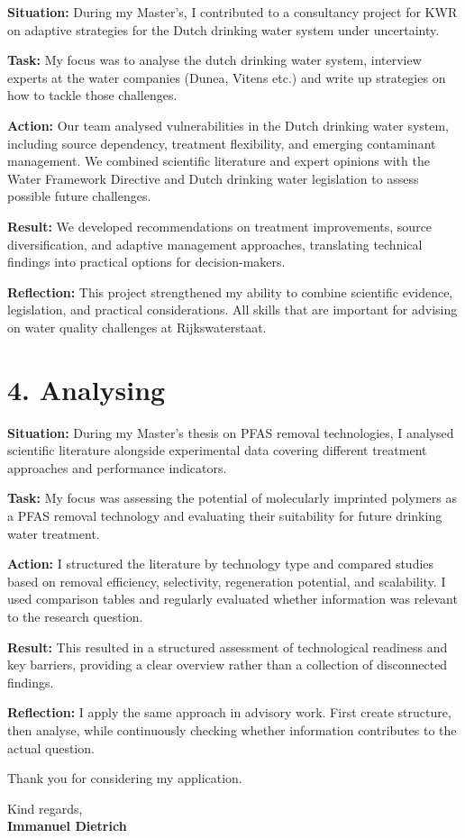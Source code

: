 \documentclass[11pt]{report}
\begin{document}
\begin{titlepage}
\textbf{Situation:} During my Master's, I contributed to a consultancy project for KWR on adaptive strategies for the Dutch drinking water system under uncertainty.

\textbf{Task:} My focus was to analyse the dutch drinking water system, interview experts at the water companies (Dunea, Vitens etc.) and write up strategies on how to tackle those challenges.

\textbf{Action:} Our team analysed vulnerabilities in the Dutch drinking water system, including source dependency, treatment flexibility, and emerging contaminant management. 
We combined scientific literature and expert opinions with the Water Framework Directive and Dutch drinking water legislation to assess possible future challenges.

\textbf{Result:} We developed recommendations on treatment improvements, source diversification, and adaptive management approaches, translating technical findings into practical options for decision-makers.

\textbf{Reflection:} This project strengthened my ability to combine scientific evidence, legislation, and practical considerations. All skills that are important for advising on water quality challenges at Rijkswaterstaat.

\vspace{1em}

\section*{4. Analysing}

\textbf{Situation:} During my Master's thesis on PFAS removal technologies, I analysed scientific literature alongside experimental data covering different treatment approaches and performance indicators.

\textbf{Task:} My focus was assessing the potential of molecularly imprinted polymers as a PFAS removal technology and evaluating their suitability for future drinking water treatment.

\textbf{Action:} I structured the literature by technology type and compared studies based on removal efficiency, selectivity, regeneration potential, and scalability. 
I used comparison tables and regularly evaluated whether information was relevant to the research question.

\textbf{Result:} This resulted in a structured assessment of technological readiness and key barriers, providing a clear overview rather than a collection of disconnected findings.

\textbf{Reflection:} I apply the same approach in advisory work. First create structure, then analyse, while continuously checking whether information contributes to the actual question.

Thank you for considering my application.

\vspace{0.7em}

\raggedright Kind regards,\\
\textbf{Immanuel Dietrich}

\end{titlepage}
\end{document}
